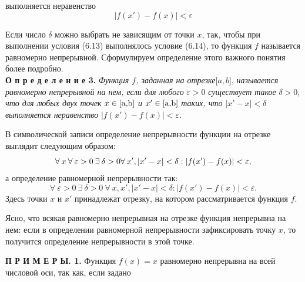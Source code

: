 \documentclass{book}
\begin{document}
\noindent выполняется неравенство
\begin{equation}
|f(x')-f(x)|<\varepsilon
\tag{6.14}
\end{equation}
\par Если число \begin{math} \delta \end{math} можно выбрать не зависящим от точки $x$, так, чтобы при выполнении условия (6.13) выполнялось условие (6.14), то функция $f$ называется равномерно непрерывной. Сформулируем определение этого важного понятия более подробно.\\
\textsf{\textbf{\small{О п р е д е л е н и е 3.}}}
\textit{Функция $f$, заданная на отрезке}[$a, b$], \textit{называется равномерно непрерывной на нем, если для любого} 
$\varepsilon>0$ \textit{существует такое} $\delta>0$, \textit{что для любых двух точек} 
\begin{math} x \in[$a,b$]\end{math}
\textit{ и} \begin{math}x' \in[$a,b$]\end{math} \textit{таких, что} \begin{math}|x'-x| < \delta \end{math}\textit{ выполняется неравенство} \begin{math}|f(x')-f(x)|<\varepsilon \end{math}.
\par В символической записи определение непрерывности функции на отрезке выглядит следующим образом:
\begin{equation} \notag
\forall \: x \: \forall \: \varepsilon>0 \: \exists \: \delta>0 \forall \: x', |x'-x|<\delta: |f(x')-f(x)|<\varepsilon,
\end{equation} а определение равномерной непрерывности так:
\begin{equation} \tag{6.15}
\forall \: \varepsilon>0 \: \exists \: \delta>0 \: \forall \: x, x', |x'-x|<\delta: |f(x')-f(x)|<\varepsilon.
\end{equation}
Здесь точки $x$ и $x'$ принадлежат отрезку, на котором рассматривается функция $f$.
\par Ясно, что всякая равномерно непрерывная на отрезке функция непрерывна на нем: если в определении равномерной непрерывности зафиксировать точку $x$, то получится определение непрерывности в этой точке.
\par\textsf{\textbf{\small{П Р И М Е Р Ы. 1.}}}
Функция \begin{math}f(x)=x\end{math} равномерно непрерывна на всей числовой оси, так как, если задано 
\end{document}
